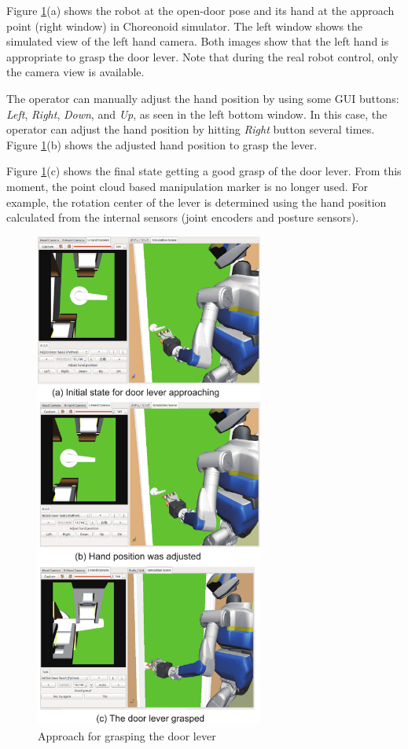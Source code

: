 Figure \ref{fig:door_lever_grasp}(a) shows the robot at the open-door pose and its hand at the
approach point (right window) in Choreonoid simulator.
The left window shows the simulated view of the left hand camera.
Both images show that the left hand is appropriate to grasp the door lever.
Note that during the real robot control, only the camera view is available. 

The operator can manually adjust the hand position by using some GUI buttons: 
{\it Left}, {\it Right}, {\it Down}, and {\it Up}, as seen in the left bottom window.
In this case, the operator can adjust the hand position by hitting {\it Right} button
several times.
Figure \ref{fig:door_lever_grasp}(b) shows the adjusted hand position to grasp the lever.

Figure \ref{fig:door_lever_grasp}(c) shows the final state getting a good grasp of the door lever.
From this moment, the point cloud based manipulation marker is no longer used.
For example, the rotation center of the lever is determined using the hand position calculated from
the internal sensors (joint encoders and posture sensors). 
%
\begin{figure}[t]
  \centering
  \includegraphics[width = 7.5cm]{img/approach_door_lever}
  \caption{Approach for grasping the door lever}
  \label{fig:door_lever_grasp}
\end{figure}


